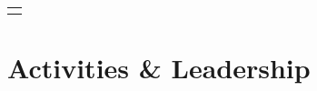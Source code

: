 \documentclass[a4paper,10pt]{extarticle} %
\begin{document}
\begin{tabular}{p{19.7cm}}
\begin{description}[style=nextline, font=$\bullet$\hspace{2mm}\normalsize]


\end{description}
\end{tabular}

\vspace{-0.6cm}
\section{\textcolor{primary}{Activities \& Leadership}}
\end{document}
